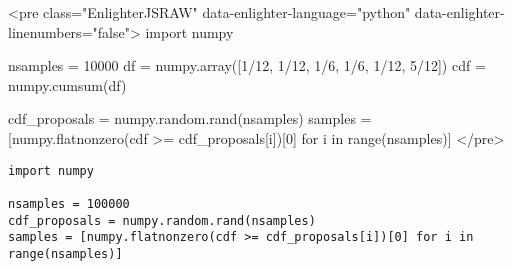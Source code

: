 \documentclass[12pt]{article}
\begin{document}
\ifblog
<pre class="EnlighterJSRAW" data-enlighter-language="python" data-enlighter-linenumbers="false">
import numpy

nsamples = 10000
df = numpy.array([1/12, 1/12, 1/6, 1/6, 1/12, 5/12])
cdf = numpy.cumsum(df)

cdf_proposals = numpy.random.rand(nsamples)
samples = [numpy.flatnonzero(cdf >= cdf_proposals[i])[0] for i in range(nsamples)]
</pre>
\fi

\iftex
\begin{verbatim}
import numpy

nsamples = 100000
cdf_proposals = numpy.random.rand(nsamples)
samples = [numpy.flatnonzero(cdf >= cdf_proposals[i])[0] for i in range(nsamples)]
\end{verbatim}
\fi
\end{document}
